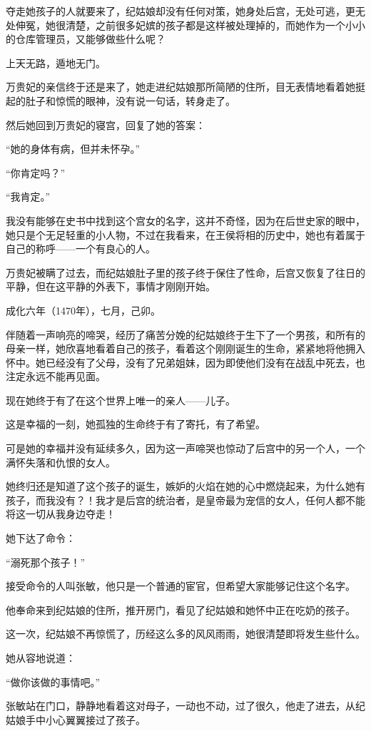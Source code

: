 \begin{multicols}{\theparacolNo}
夺走她孩子的人就要来了，纪姑娘却没有任何对策，她身处后宫，无处可逃，更无处伸冤，她很清楚，之前很多妃嫔的孩子都是这样被处理掉的，而她作为一个小小的仓库管理员，又能够做些什么呢？

上天无路，遁地无门。

万贵妃的亲信终于还是来了，她走进纪姑娘那所简陋的住所，目无表情地看着她挺起的肚子和惊慌的眼神，没有说一句话，转身走了。

然后她回到万贵妃的寝宫，回复了她的答案：

“她的身体有病，但并未怀孕。”

“你肯定吗？”

“我肯定。”

我没有能够在史书中找到这个宫女的名字，这并不奇怪，因为在后世史家的眼中，她只是个无足轻重的小人物，不过在我看来，在王侯将相的历史中，她也有着属于自己的称呼——一个有良心的人。

万贵妃被瞒了过去，而纪姑娘肚子里的孩子终于保住了性命，后宫又恢复了往日的平静，但在这平静的外表下，事情才刚刚开始。

成化六年（1470年），七月，己卯。

伴随着一声响亮的啼哭，经历了痛苦分娩的纪姑娘终于生下了一个男孩，和所有的母亲一样，她欣喜地看着自己的孩子，看着这个刚刚诞生的生命，紧紧地将他拥入怀中。她已经没有了父母，没有了兄弟姐妹，因为即使他们没有在战乱中死去，也注定永远不能再见面。

现在她终于有了在这个世界上唯一的亲人——儿子。

这是幸福的一刻，她孤独的生命终于有了寄托，有了希望。

可是她的幸福并没有延续多久，因为这一声啼哭也惊动了后宫中的另一个人，一个满怀失落和仇恨的女人。

她终归还是知道了这个孩子的诞生，嫉妒的火焰在她的心中燃烧起来，为什么她有孩子，而我没有？！我才是后宫的统治者，是皇帝最为宠信的女人，任何人都不能将这一切从我身边夺走！

她下达了命令：

“溺死那个孩子！”

接受命令的人叫张敏，他只是一个普通的宦官，但希望大家能够记住这个名字。

他奉命来到纪姑娘的住所，推开房门，看见了纪姑娘和她怀中正在吃奶的孩子。

这一次，纪姑娘不再惊慌了，历经这么多的风风雨雨，她很清楚即将发生些什么。

她从容地说道：

“做你该做的事情吧。”

张敏站在门口，静静地看着这对母子，一动也不动，过了很久，他走了进去，从纪姑娘手中小心翼翼接过了孩子。


\end{multicols}
